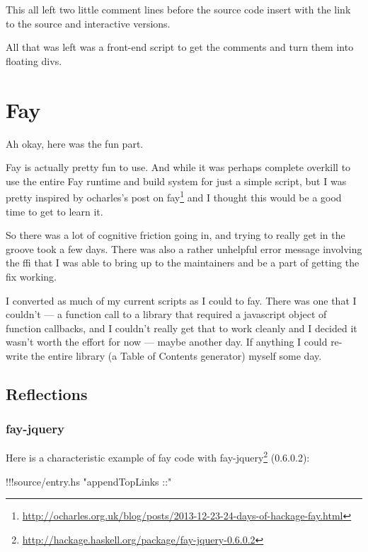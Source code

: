 \documentclass[]{article}
\newenvironment{Shaded}{}{}
\newcommand{\StringTok}[1]{\textcolor[rgb]{0.25,0.44,0.63}{{#1}}}
\newcommand{\FunctionTok}[1]{\textcolor[rgb]{0.02,0.16,0.49}{{#1}}}
\newcommand{\NormalTok}[1]{{#1}}
\renewcommand{\href}[2]{#2\footnote{\url{#1}}}
\begin{document}
This all left two little comment lines before the source code insert
with the link to the source and interactive versions.

All that was left was a front-end script to get the comments and turn
them into floating divs.

\section{Fay}\label{fay}

Ah okay, here was the fun part.

Fay is actually pretty fun to use. And while it was perhaps complete
overkill to use the entire Fay runtime and build system for just a
simple script, but I was pretty inspired by
\href{http://ocharles.org.uk/blog/posts/2013-12-23-24-days-of-hackage-fay.html}{ocharles's
post on fay} and I thought this would be a good time to get to learn it.

So there was a lot of cognitive friction going in, and trying to really
get in the groove took a few days. There was also a rather unhelpful
error message involving the ffi that I was able to bring up to the
maintainers and be a part of getting the fix working.

I converted as much of my current scripts as I could to fay. There was
one that I couldn't --- a function call to a library that required a
javascript object of function callbacks, and I couldn't really get that
to work cleanly and I decided it wasn't worth the effort for now ---
maybe another day. If anything I could re-write the entire library (a
Table of Contents generator) myself some day.

\subsection{Reflections}\label{reflections-1}

\subsubsection{fay-jquery}\label{fay-jquery}

Here is a characteristic example of fay code with
\href{http://hackage.haskell.org/package/fay-jquery-0.6.0.2}{fay-jquery}
(0.6.0.2):

\begin{Shaded}
\begin{Highlighting}[]
\FunctionTok{!!!}\NormalTok{source}\FunctionTok{/}\NormalTok{entry}\FunctionTok{.}\NormalTok{hs }\StringTok{"appendTopLinks ::"}
\end{Highlighting}
\end{Shaded}
\end{document}
